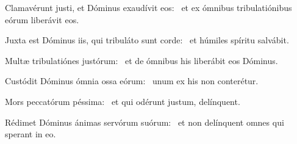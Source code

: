 \item Clamavérunt justi, et Dóminus exaudívit eos:~\psstar{} et ex ómnibus tribulatiónibus eórum liberávit eos.

\item Juxta est Dóminus iis, qui tribuláto sunt corde:~\psstar{} et húmiles spíritu salvábit.

\item Multæ tribulatiónes justó\-rum:~\psstar{} et de ómnibus his liberábit eos Dóminus.

\item Custódit Dóminus ómnia ossa eórum:~\psstar{} unum ex his non conterétur.

\item Mors peccatórum péssima:~\psstar{} et qui odérunt justum, delínquent.

\item Rédimet Dóminus ánimas servórum suórum:~\psstar{} et non delínquent omnes qui sperant in eo.


